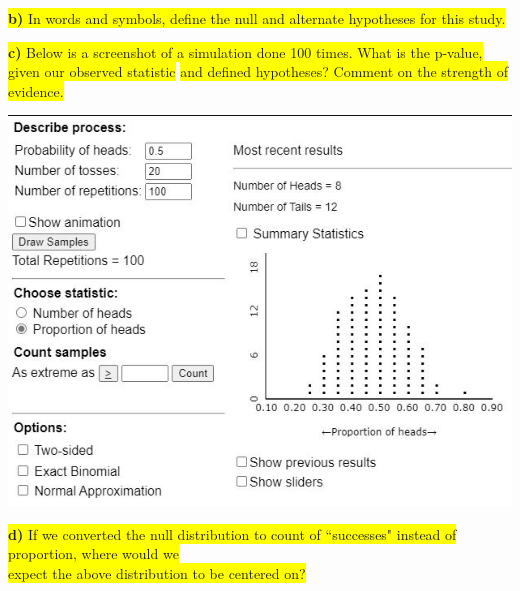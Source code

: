 \documentclass{article}
\newif\ifPrintSolution
\newcommand{\sol}[1]{\ifPrintSolution {\color{blue} #1 } \fi}
\begin{document}
\vspace{0.25in}

\hspace{0.1in} \colorbox{yellow}{\textbf{b) } In words and symbols, define the null and alternate hypotheses for this study.}

\sol{$H_0: \pi = 0.5.$ The long run proportion of times that Mercury picks the container with more bananas is 50$\%$.\\
$H_a: \pi \ge 0.5.$ The long run proportion of times that Mercury picks the container with more bananas is greater than 50$\%$.}

\vspace{0.25in}

\hspace{0.1in} \colorbox{yellow}{\textbf{c) } Below is a screenshot of a simulation done 100 times. What is the p-value, given our observed statistic} \colorbox{yellow}{and defined hypotheses? Comment on the strength of evidence.}

\begin{center}
    \includegraphics[scale=0.8]{2_Applet.JPG}
\end{center}

\sol{Our p-value is $\frac{1}{100} = 0.01$. This is very strong evidence against the null hypothesis that Mercury was choosing the boxes randomly.}

\vspace{0.25in}

\hspace{0.1in} \colorbox{yellow}{\textbf{d) } If we converted the null distribution to count of ``successes" instead of proportion, where would we}\\  \colorbox{yellow}{expect the above distribution to be centered on?}
\end{document}
